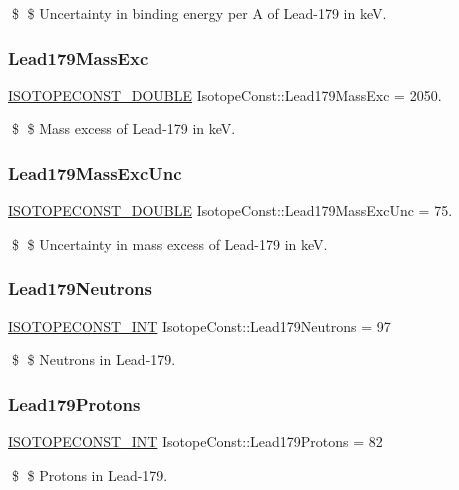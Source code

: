 \$ \$ Uncertainty in binding energy per A of Lead-\/179 in keV. \mbox{\label{group___isotope_const-_lead-_pb179_ga50e0b2b88d438850aeab1e1831464735}} 
\subsubsection{\texorpdfstring{Lead179\+Mass\+Exc}{Lead179MassExc}}
{\footnotesize\ttfamily \mbox{\hyperlink{group___isotope_const-_macros_ga8f45a7272ce02c0b4c65c44636ed719a}{I\+S\+O\+T\+O\+P\+E\+C\+O\+N\+S\+T\+\_\+\+D\+O\+U\+B\+LE}} Isotope\+Const\+::\+Lead179\+Mass\+Exc = 2050.}

\$ \$ Mass excess of Lead-\/179 in keV. \mbox{\label{group___isotope_const-_lead-_pb179_ga3f334c868c1c9ad51431062891b7e236}} 
\subsubsection{\texorpdfstring{Lead179\+Mass\+Exc\+Unc}{Lead179MassExcUnc}}
{\footnotesize\ttfamily \mbox{\hyperlink{group___isotope_const-_macros_ga8f45a7272ce02c0b4c65c44636ed719a}{I\+S\+O\+T\+O\+P\+E\+C\+O\+N\+S\+T\+\_\+\+D\+O\+U\+B\+LE}} Isotope\+Const\+::\+Lead179\+Mass\+Exc\+Unc = 75.}

\$ \$ Uncertainty in mass excess of Lead-\/179 in keV. \mbox{\label{group___isotope_const-_lead-_pb179_ga91c1d04faa31b80e23c2b053d9957419}} 
\subsubsection{\texorpdfstring{Lead179\+Neutrons}{Lead179Neutrons}}
{\footnotesize\ttfamily \mbox{\hyperlink{group___isotope_const-_macros_ga5f18360b3e99483a35c32d789e62621c}{I\+S\+O\+T\+O\+P\+E\+C\+O\+N\+S\+T\+\_\+\+I\+NT}} Isotope\+Const\+::\+Lead179\+Neutrons = 97}

\$ \$ Neutrons in Lead-\/179. \mbox{\label{group___isotope_const-_lead-_pb179_ga6148a1a248d4d9da1fcdc11eea4f5654}} 
\subsubsection{\texorpdfstring{Lead179\+Protons}{Lead179Protons}}
{\footnotesize\ttfamily \mbox{\hyperlink{group___isotope_const-_macros_ga5f18360b3e99483a35c32d789e62621c}{I\+S\+O\+T\+O\+P\+E\+C\+O\+N\+S\+T\+\_\+\+I\+NT}} Isotope\+Const\+::\+Lead179\+Protons = 82}

\$ \$ Protons in Lead-\/179. 